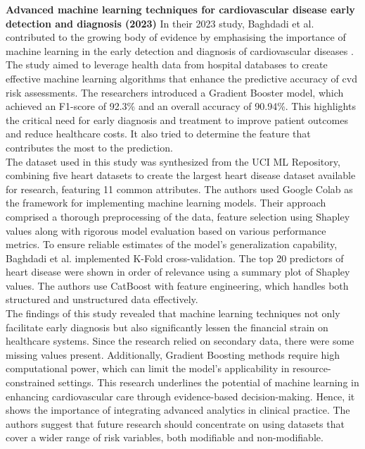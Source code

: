 \noindent
\textbf{Advanced machine learning techniques for cardiovascular disease early detection and diagnosis (2023) }  
In their 2023 study, Baghdadi et al. contributed to the growing body of evidence by emphasising the importance of machine learning in the early detection and diagnosis of cardiovascular diseases \citep{baghdadi2023advanced}. The study aimed to leverage health data from hospital databases to create effective machine learning algorithms that enhance the predictive accuracy of \gls{cvd} risk assessments. The researchers introduced a Gradient Booster model, which achieved an F1-score of 92.3\% and an overall accuracy of 90.94\%. This highlights the critical need for early diagnosis and treatment to improve patient outcomes and reduce healthcare costs. It also tried to determine the feature that contributes the most to the prediction. \\
The dataset used in this study was synthesized from the UCI ML Repository, combining five heart datasets to create the largest heart disease dataset available for research, featuring 11 common attributes.  The authors used Google Colab as the framework for implementing machine learning models. Their approach comprised a thorough preprocessing of the data, feature selection using Shapley values along with rigorous model evaluation based on various performance metrics. To ensure reliable estimates of the model's generalization capability, Baghdadi et al. implemented K-Fold cross-validation. The top 20 predictors of heart disease were shown in order of relevance using a summary plot of Shapley values. The authors use CatBoost with feature engineering, which handles both structured and unstructured data effectively.\\
The findings of this study revealed that machine learning techniques not only facilitate early diagnosis but also significantly lessen the financial strain on healthcare systems. Since the research relied on secondary data, there were some missing values present. Additionally, Gradient Boosting methods require high computational power, which can limit the model’s applicability in resource-constrained settings. This research underlines the potential of machine learning in enhancing cardiovascular care through evidence-based decision-making. Hence, it shows the importance of integrating advanced analytics in clinical practice. The authors suggest that future research should concentrate on using datasets that cover a wider range of risk variables, both modifiable and non-modifiable. \\
\vspace{0.5 em}

